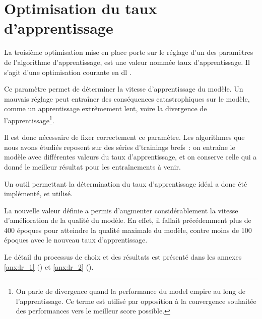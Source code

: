 \section{Optimisation du taux d'apprentissage}\label{lr_opti_papud}
La troisième optimisation mise en place porte sur le réglage d'un des paramètres de l'algorithme d'apprentissage, est une valeur nommée \og taux d'apprentissage\fg{}. Il s'agit d'une optimisation courante en \gls{dl} \autocite{LearningRateOptimisation}.

Ce paramètre permet de déterminer la vitesse d'apprentissage du modèle.
Un mauvais réglage peut entraîner des conséquences catastrophiques sur le modèle, comme un apprentissage extrêmement lent, voire la divergence de l'apprentissage\footnote{On parle de divergence quand la performance du \gls{model} empire au long de l'apprentissage. Ce terme est utilisé par opposition à la convergence souhaitée des performances vers le meilleur score possible.}.

Il est donc nécessaire de fixer correctement ce paramètre.
Les algorithmes que nous avons étudiés reposent sur des séries d'\glspl{training} brefs~: on entraîne le modèle avec différentes valeurs du taux d'apprentissage, et on conserve celle qui a donné le meilleur résultat pour les entraînements à venir.

Un outil permettant la détermination du taux d'apprentissage idéal a donc été implémenté, et utilisé.

La nouvelle valeur définie a permis d'augmenter considérablement la vitesse d'amélioration de la qualité du modèle. En effet, il fallait précédemment plus de 400 époques pour atteindre la qualité maximale du modèle, contre moins de 100 époques avec le nouveau taux d'apprentissage. %

Le détail du processus de choix et des résultats est présenté dans les annexes \ref{anx:lr_1} () et \ref{anx:lr_2} ().
